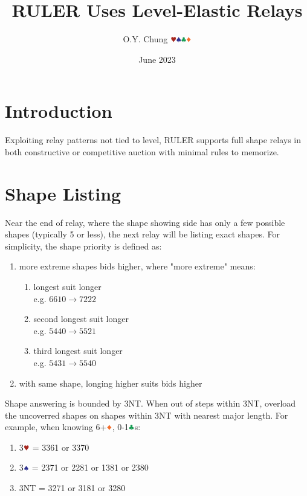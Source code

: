\documentclass{article}
\title{RULER Uses Level-Elastic Relays}
\author{O.Y. Chung $\hhh\sss\ccc\ddd$}
\date{June 2023}
\newcommand*{\ccc}{\textcolor{ForestGreen}{\clubsuit}}
\newcommand*{\ddd}{\textcolor{Orange}{\vardiamondsuit}}
\newcommand*{\hhh}{\textcolor{Mahogany}{\varheartsuit}}
\newcommand*{\sss}{\textcolor{Blue}{\spadesuit}}
\begin{document}
\begin{CJK*}{UTF8}{gbsn}
\end{CJK*}
\maketitle

\begin{multicols}{2}

\section{Introduction}
Exploiting relay patterns not tied to level, RULER supports full shape relays in both constructive or competitive auction with minimal rules to memorize.

\section{Shape Listing}
Near the end of relay, where the shape showing side has only a few possible shapes (typically 5 or less), the next relay will be listing exact shapes. For simplicity, the shape priority is defined as:

\begin{enumerate}
    \setlength\itemsep{-0.2em}
    \item more extreme shapes bids higher, where "more extreme" means:
    \begin{enumerate}
        \setlength\itemsep{-0.2em}
        \item longest suit longer \\
            e.g. $6610 \rightarrow 7222$
        \item second longest suit longer \\
            e.g. $5440 \rightarrow 5521$
        \item third longest suit longer \\
            e.g. $5431 \rightarrow 5540$
    \end{enumerate}
    \item with same shape, longing higher suits bids higher
\end{enumerate}

\noindent Shape answering is bounded by 3NT. When out of steps within 3NT, overload the uncoverred shapes on shapes within 3NT with nearest major length. For example, when knowing 6+$\ddd$, 0-1$\ccc$s:
\begin{enumerate}
    \setlength\itemsep{-0.2em}
    \item 3$\hhh$ = 3361 or 3370
    \item 3$\sss$ = 2371 or 2281 or 1381 or 2380
    \item 3NT = 3271 or 3181 or 3280
\end{enumerate}


\end{multicols}
\end{document}
